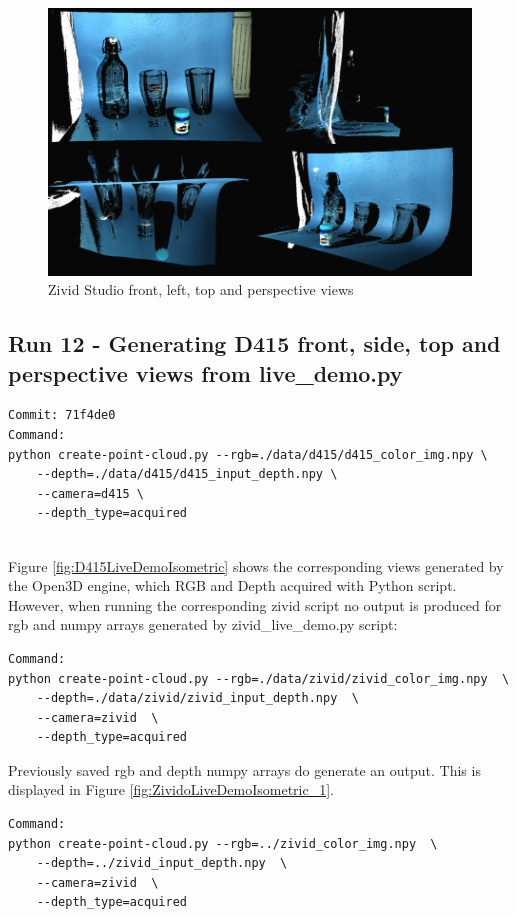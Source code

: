 \begin{figure}[h!]
\centering
\includegraphics[width=\textwidth]{Figures/ZividStudioIsometric.png}
\caption{Zivid Studio front, left, top and perspective views}
\label{fig:ZividStudioIsometric}
\end{figure}

\subsection{Run 12 - Generating D415 front, side, top and perspective views from live\_demo.py }
\label{app_res:12}
\begin{verbatim}
Commit: 71f4de0
Command: 
python create-point-cloud.py --rgb=./data/d415/d415_color_img.npy \
    --depth=./data/d415/d415_input_depth.npy \ 
    --camera=d415 \  
    --depth_type=acquired
    
\end{verbatim}
Figure \ref{fig:D415LiveDemoIsometric} shows the corresponding views generated by the Open3D engine, which RGB and Depth acquired with Python script. However, when running the corresponding zivid script no output is produced for rgb and numpy arrays generated by zivid\_live\_demo.py script:
\begin{verbatim}
Command:
python create-point-cloud.py --rgb=./data/zivid/zivid_color_img.npy  \ 
    --depth=./data/zivid/zivid_input_depth.npy  \
    --camera=zivid  \
    --depth_type=acquired 
\end{verbatim}
Previously saved rgb and depth numpy arrays do generate an output. This is displayed in Figure \ref{fig:ZividoLiveDemoIsometric_1}.
\begin{verbatim}
Command:
python create-point-cloud.py --rgb=../zivid_color_img.npy  \ 
    --depth=../zivid_input_depth.npy  \
    --camera=zivid  \
    --depth_type=acquired 
\end{verbatim}

